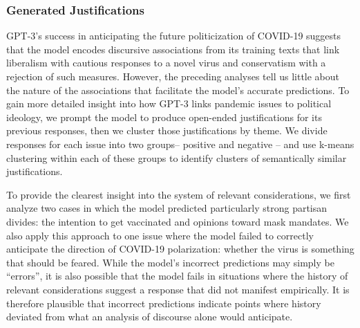 \documentclass{article} %
\begin{document}
\subsubsection*{Generated Justifications}

GPT-3's success in anticipating the future politicization of COVID-19
suggests that the model encodes discursive associations from its
training texts that link liberalism with cautious responses to a novel
virus and conservatism with a rejection of such measures. However, the
preceding analyses tell us little about the nature of the associations
that facilitate the model's accurate predictions. To gain more detailed
insight into how GPT-3 links pandemic issues to political ideology, we
prompt the model to produce open-ended justifications for its previous
responses, then we cluster those justifications by theme. We divide
responses for each issue into two groups-- positive and negative -- and
use k-means clustering within each of these groups to identify clusters
of semantically similar justifications.

To provide the clearest insight into the system of relevant
considerations, we first analyze two cases in which the model predicted
particularly strong partisan divides: the intention to get vaccinated
and opinions toward mask mandates. We also apply this approach to one
issue where the model failed to correctly anticipate the direction of
COVID-19 polarization: whether the virus is something that should be
feared. While the model's incorrect predictions may simply be
``errors'', it is also possible that the model fails in situations where
the history of relevant considerations suggest a response that did not
manifest empirically. It is therefore plausible that incorrect
predictions indicate points where history deviated from what an analysis
of discourse alone would anticipate.
\end{document}
